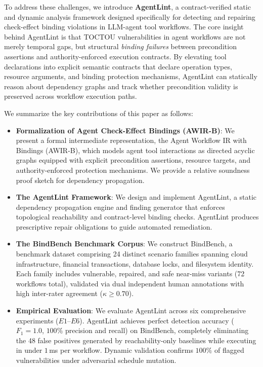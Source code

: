 To address these challenges, we introduce \textbf{AgentLint}, a contract-verified static and dynamic analysis framework designed specifically for detecting and repairing check-effect binding violations in LLM-agent tool workflows. The core insight behind AgentLint is that TOCTOU vulnerabilities in agent workflows are not merely temporal gaps, but structural \emph{binding failures} between precondition assertions and authority-enforced execution contracts. By elevating tool declarations into explicit semantic contracts that declare operation types, resource arguments, and binding protection mechanisms, AgentLint can statically reason about dependency graphs and track whether precondition validity is preserved across workflow execution paths.

We summarize the key contributions of this paper as follows:
\begin{itemize}
    \item \textbf{Formalization of Agent Check-Effect Bindings (\textsf{AWIR-B})}: We present a formal intermediate representation, the Agent Workflow IR with Bindings (\textsf{AWIR-B}), which models agent tool interactions as directed acyclic graphs equipped with explicit precondition assertions, resource targets, and authority-enforced protection mechanisms. We provide a relative soundness proof sketch for dependency propagation.
    \item \textbf{The AgentLint Framework}: We design and implement AgentLint, a static dependency propagation engine and finding generator that enforces topological reachability and contract-level binding checks. AgentLint produces prescriptive repair obligations to guide automated remediation.
    \item \textbf{The \textsf{BindBench} Benchmark Corpus}: We construct \textsf{BindBench}, a benchmark dataset comprising 24 distinct scenario families spanning cloud infrastructure, financial transactions, database locks, and filesystem identity. Each family includes vulnerable, repaired, and safe near-miss variants (72 workflows total), validated via dual independent human annotations with high inter-rater agreement ($\kappa \ge 0.70$).
    \item \textbf{Empirical Evaluation}: We evaluate AgentLint across six comprehensive experiments ($E1$–$E6$). AgentLint achieves perfect detection accuracy ($F_1 = 1.0$, $100\%$ precision and recall) on \textsf{BindBench}, completely eliminating the 48 false positives generated by reachability-only baselines while executing in under $1$\,ms per workflow. Dynamic validation confirms $100\%$ of flagged vulnerabilities under adversarial schedule mutation.
\end{itemize}

